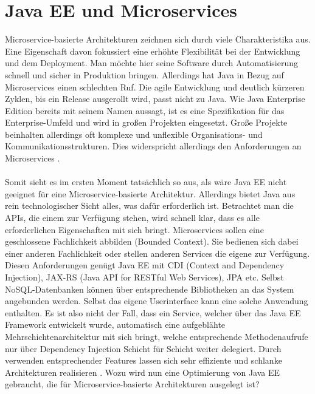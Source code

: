 \section{Java EE und Microservices}
Microservice-basierte Architekturen zeichnen sich durch viele Charakteristika aus. Eine Eigenschaft davon fokussiert eine erhöhte Flexibilität bei der Entwicklung und dem Deployment. Man möchte hier seine Software durch Automatisierung schnell und sicher in Produktion bringen. Allerdings hat Java in Bezug auf Microservices einen schlechten Ruf. Die agile Entwicklung und deutlich kürzeren Zyklen, bis ein Release ausgerollt wird, passt nicht zu Java. Wie Java Enterprise Edition bereits mit seinem Namen aussagt, ist es eine Spezifikation für das Enterprise-Umfeld und wird in großen Projekten eingesetzt. Große Projekte beinhalten allerdings oft komplexe und unflexible Organisations- und Kommunikationsstrukturen. Dies widerspricht allerdings den Anforderungen an Microservices \cite{jaxcenter.2016}. \\ \\
Somit sieht es im ersten Moment tatsächlich so aus, als wäre Java EE nicht geeignet für eine Microservice-basierte Architektur. Allerdings bietet Java aus rein technologischer Sicht alles, was dafür erforderlich ist. Betrachtet man die APIs, die einem zur Verfügung stehen, wird schnell klar, dass es alle erforderlichen Eigenschaften mit sich bringt. Microservices sollen eine geschlossene Fachlichkeit abbilden (Bounded Context). Sie bedienen sich dabei einer anderen Fachlichkeit oder stellen anderen Services die eigene zur Verfügung. Diesen Anforderungen genügt Java EE mit CDI (Context and Dependency Injection), JAX-RS (Java API for RESTful Web Services), JPA etc. Selbst NoSQL-Datenbanken können über entsprechende Bibliotheken an das System angebunden werden. Selbst das eigene Userinterface kann eine solche Anwendung enthalten. Es ist also nicht der Fall, dass ein Service, welcher über das Java EE Framework entwickelt wurde, automatisch eine aufgeblähte Mehrschichtenarchitektur mit sich bringt, welche entsprechende Methodenaufrufe nur über Dependency Injection Schicht für Schicht weiter delegiert. Durch verwenden entsprechender Features lassen sich sehr effiziente und schlanke Architekturen realisieren \cite{jaxcenter.2016}. Wozu wird nun eine Optimierung von Java EE gebraucht, die für Microservice-basierte Architekturen ausgelegt ist?


